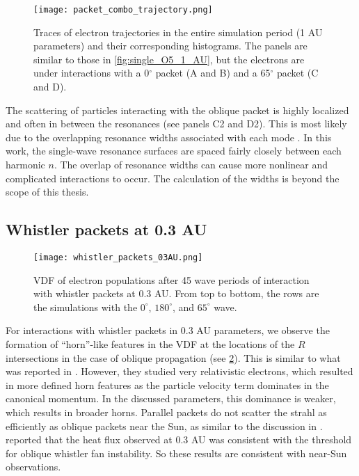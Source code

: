 \begin{figure}[hbtp]
    \centering
    \texttt{[image: packet\_combo\_trajectory.png]}
    \caption{Traces of electron trajectories in the entire simulation period
        (1 AU parameters) and their corresponding histograms. The panels are
        similar to those in \cref{fig:single_O5_1_AU}, but the electrons are
        under interactions with a 0$^\circ$ packet (A and B) and a 65$^\circ$
        packet (C and D).}
    \label{fig:packet_O0_1_AU}
\end{figure}

The scattering of particles interacting with the oblique packet is highly
localized and often in between the resonances (see panels C2 and D2). This is
most likely due to the overlapping resonance widths associated with each mode
\citep{Karimabadi1990}. In this work, the single-wave resonance surfaces are
spaced fairly closely between each harmonic $n$. The overlap of resonance widths
can cause more nonlinear and complicated interactions to occur. The calculation
of the widths is beyond the scope of this thesis.

\subsection{Whistler packets at 0.3 AU}

\begin{figure}[hbtp]
    \centering
    \texttt{[image: whistler\_packets\_03AU.png]}
    \caption{VDF of electron populations after 45 wave periods of interaction
    with whistler packets at 0.3 AU. From top to bottom, the rows are the
simulations with the $0^\circ$, $180^\circ$, and $65^\circ$ wave.}
\label{fig:whistler_packets_03AU}
\end{figure}

For interactions with whistler packets in 0.3 AU parameters, we observe the
formation of ``horn''-like features in the VDF at the locations of the
$R$ intersections in the case of oblique propagation (see
\cref{fig:whistler_packets_03AU}). This is similar to what was reported in
\cite{RobergClark2019}. However, they studied very relativistic
electrons, which resulted in more defined horn features as the particle velocity
term dominates in the canonical momentum. In the discussed parameters, this 
dominance is weaker, which results in broader horns. Parallel packets do not 
scatter the strahl as efficiently as oblique packets near the Sun,
as similar to the discussion in \cite{Vocks2005}. \cite{Halekas2020b} reported
that the heat flux observed at 0.3 AU was consistent with the threshold for
oblique whistler fan instability. So these results are consistent with near-Sun 
observations.



